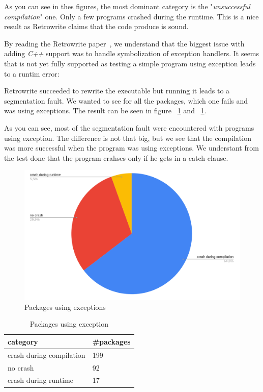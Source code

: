\documentclass[a4paper,11pt,oneside]{report}
\newcommand{\sysname}{Retrowrite\xspace}
\begin{document}
As you can see in thes figures, the most dominant category is the
"\textit{unsuccessful compilation}" one. Only a few programs crashed during the
runtime. This is a nice result as \sysname claims that the code produce is
sound.

By reading the \sysname paper~\cite{dinesh20oakland}, we understand that
the biggest issue with adding \textit{C++} support was to handle symbolization
of exception handlers. It seems that is not yet fully supported as testing a
simple program using exception leads to a runtim error:



Retrowrite succeeded to rewrite the executable but running it leads to a segmentation fault.
We wanted to see for all the packages, which one fails and was using
exceptions. The result can be seen in figure ~\ref{fig:exception} and
~\ref{table:exception}.

As you can see, most of the segmentation fault were encountered with programs
using exception. The difference is not that big, but we see that the compilation
was more successful when the program was using exceptions. We understant from
the test done that the program crahses only if he gets in a catch clause.

\newpage

\begin{figure}[h]
    \centering
    \includegraphics[width=15cm]{exception.png} 
    \caption{Packages using exceptions}
    \label{fig:exception}
\end{figure}

\begin{table}[h]
    \centering
    \begin{tabular}{ll} 
        \hline
        category                & \#packages  \\ 
        \hline
        crash during compilation & 199         \\
        no crash                 & 92          \\
        crash during runtime     & 17          \\
        \hline
    \end{tabular}
    \caption{Packages using exception}
    \label{table:exception}
\end{table}
\end{document}
